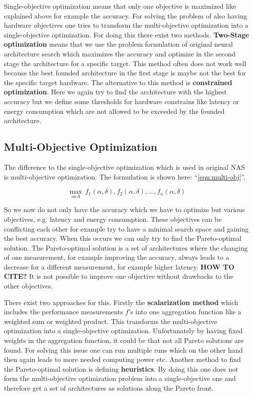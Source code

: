 \documentclass[conference]{IEEEtran}
\begin{document}
Single-objective optimization means that only one objective is maximized like explained above for example the accuracy. For solving the problem of also having hardware objectives one tries to transform the multi-objective optimization into a single-objective optimization. For doing this there exist two methods. \textbf{Two-Stage optimization} means that we use the problem formulation of original neural architecture search which maximizes the accuracy and optimize in the second stage the architecture for a specific target. This method often does not work well because the best founded architecture in the first stage is maybe not the best for the specific target hardware. The alternative to this method is \textbf{constrained optimization}. Here we again try to find the architecture with the highest accuracy but we define some thresholds for hardware constrains like latency or energy consumption which are not allowed to be exceeded by the founded architecture. 

\subsection{Multi-Objective Optimization}

The difference to the single-objective optimization which is used in original NAS is multi-objective optimization. The formulation is shown here: ``\eqref{eqn:multi-obj}''.
 
\begin{equation}
\label{eqn:multi-obj}
\max_{\alpha\epsilon A}\,f_{1}(\alpha, \delta),f_{2}(\alpha, \delta),\ldots ,f_{n}(\alpha, \delta)
\end{equation}     

So we now do not only have the accuracy which we have to optimize but various objectives, e.g. latency and energy consumption. These objectives can be conflicting each other for example try to have a minimal search space and gaining the best accuracy. When this occurs we can only try to find the Pareto-optimal solution. The Pareto-optimal solution is a set of architectures where the changing of one measurement, for example improving the accuracy, always leads to a decrease for a different measurement, for example higher latency. \textbf{HOW TO CITE?} It is not possible to improve one objective without drawbacks to the other objectives.

There exist two approaches for this. Firstly the \textbf{scalarization method} which includes the performance measurements $f$'s into one aggregation function like a weighted sum or weighted product. This transforms the multi-objective optimization into a single-objective optimization. Unfortunately by having fixed weights in the aggregation function, it could be that not all Pareto solutions are found. For solving this issue one can run multiple runs which on the other hand then again leads to more needed computing power etc. Another method to find the Pareto-optimal solution is defining \textbf{heuristics}. By doing this one does not form the multi-objective optimization problem into a single-objective one and therefore get a set of architectures as solutions along the Pareto front.
\end{document}

